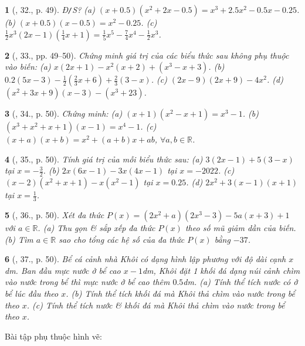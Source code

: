 \documentclass{article}
\newtheorem{baitoan}{}
\begin{document}
\begin{baitoan}[\cite{SBT_Toan_7_Canh_Dieu_tap_2}, 32., p. 49]
	\emph{Đ\texttt{/}S?} (a) $(x + 0.5)(x^2 + 2x - 0.5) = x^3 + 2.5x^2 - 0.5x - 0.25$. (b) $(x + 0.5)(x - 0.5) = x^2  - 0.25$. (c) $\frac{1}{2}x^3(2x - 1)\left(\frac{1}{4}x + 1\right) = \frac{1}{5}x^5 - \frac{7}{4}x^4 - \frac{1}{2}x^3$.
\end{baitoan}

\begin{baitoan}[\cite{SBT_Toan_7_Canh_Dieu_tap_2}, 33., pp. 49--50]
	Chứng minh giá trị của các biểu thức sau không phụ thuộc vào biến: (a) $x(2x + 1) - x^2(x + 2) + (x^3 - x + 3)$. (b) $0.2(5x - 3) - \frac{1}{2}\left(\frac{2}{3}x + 6\right) + \frac{2}{3}(3 - x)$. (c) $(2x - 9)(2x + 9) - 4x^2$. (d) $(x^2 + 3x + 9)(x - 3) - (x^3 + 23)$.
\end{baitoan}

\begin{baitoan}[\cite{SBT_Toan_7_Canh_Dieu_tap_2}, 34., p. 50]
	Chứng minh: (a) $(x + 1)(x^2 - x + 1) = x^3 - 1$. (b) $(x^3 + x^2 + x + 1)(x - 1) = x^4 - 1$. (c) $(x + a)(x + b) = x^2 + (a + b)x + ab$, $\forall a,b\in\mathbb{R}$.
\end{baitoan}

\begin{baitoan}[\cite{SBT_Toan_7_Canh_Dieu_tap_2}, 35., p. 50]
	Tính giá trị của mỗi biểu thức sau: (a) $3(2x - 1) + 5(3 - x)$ tại $x = -\frac{3}{2}$. (b) $2x(6x - 1) - 3x(4x - 1)$ tại $x = -2022$. (c) $(x - 2)(x^2 + x + 1) - x(x^2 - 1)$ tại $x = 0.25$. (d) $2x^2 + 3(x - 1)(x + 1)$ tại $x = \frac{1}{3}$.
\end{baitoan}

\begin{baitoan}[\cite{SBT_Toan_7_Canh_Dieu_tap_2}, 36., p. 50]
	Xét đa thức $P(x) = (2x^2 + a)(2x^3 - 3) - 5a(x + 3) + 1$ với $a\in\mathbb{R}$. (a) Thu gọn \& sắp xếp đa thức $P(x)$ theo số mũ giảm dần của biến. (b) Tìm $a\in\mathbb{R}$ sao cho tổng các hệ số của đa thức $P(x)$ bằng $-37$.
\end{baitoan}

\begin{baitoan}[\cite{SBT_Toan_7_Canh_Dieu_tap_2}, 37., p. 50]
	Bể cá cảnh nhà Khôi có dạng hình lập phương với độ dài cạnh $x$\emph{dm}. Ban đầu mực nước ở bể cao $x - 1$\emph{dm}, Khôi đặt 1 khối đá dạng núi cảnh chìm vào nước trong bể thì mực nước ở bể cao thêm $0.5$\emph{dm}. (a) Tính thể tích nước có ở bể lúc đầu theo $x$. (b) Tính thể tích khối đá mà Khôi thả chìm vào nước trong bể theo $x$. (c) Tính thể tích nước \& khối đá mà Khôi thả chìm vào nước trong bể theo $x$.
\end{baitoan}
Bài tập phụ thuộc hình vẽ: \cite[38., p. 50]{SBT_Toan_7_Canh_Dieu_tap_2}
\end{document}
